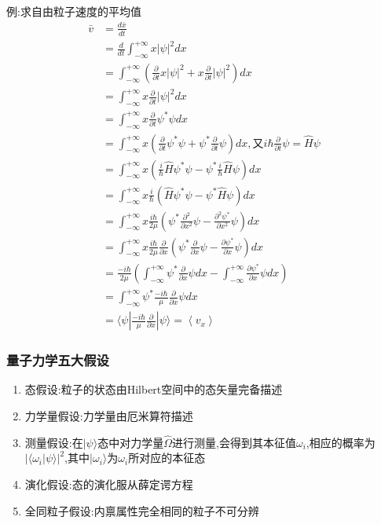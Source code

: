 \documentclass[lang=cn,10pt]{elegantbook}
\begin{document}
 例:求自由粒子速度的平均值
 \begin{equation*}
 	\begin{split}
 		\bar{v}&=\frac{d\bar{x}}{dt}
 		\\
 		&=\frac{d}{dt}\int_{-\infty}^{+\infty}{x|\psi |^2}dx
 		\\
 		&=\int_{-\infty}^{+\infty}{\left( \frac{\partial}{\partial t}x|\psi |^2+x\frac{\partial}{\partial t}|\psi |^2 \right)}dx
 		\\
 		&=\int_{-\infty}^{+\infty}{x\frac{\partial}{\partial t}|\psi |^2}dx
 		\\
 		&=\int_{-\infty}^{+\infty}{x\frac{\partial}{\partial t}\psi ^*\psi}dx
 		\\
 		&=\int_{-\infty}^{+\infty}{x\left( \frac{\partial}{\partial t}\psi ^*\psi +\psi ^*\frac{\partial}{\partial t}\psi \right)}dx,\text{又}i\hbar \frac{\partial}{\partial t}\psi =\hat{H}\psi 
 		\\
 		&=\int_{-\infty}^{+\infty}{x\left( \frac{i}{\hbar}\hat{H}\psi ^*\psi -\psi ^*\frac{i}{\hbar}\hat{H}\psi \right)}dx
 		\\
 		&=\int_{-\infty}^{+\infty}{x\frac{i}{\hbar}\left( \hat{H}\psi ^*\psi -\psi ^*\hat{H}\psi \right)}dx
 		\\
 		&=\int_{-\infty}^{+\infty}{x\frac{i\hbar}{2\mu}\left( \psi ^*\frac{\partial ^2}{\partial x^2}\psi -\frac{\partial ^2\psi ^*}{\partial x^2}\psi \right)}dx
 		\\
 		&=\int_{-\infty}^{+\infty}{x\frac{i\hbar}{2\mu}\frac{\partial}{\partial x}\left( \psi ^*\frac{\partial}{\partial x}\psi -\frac{\partial \psi ^*}{\partial x}\psi \right)}dx
 		\\
 		&=\frac{-i\hbar}{2\mu}\left( \int_{-\infty}^{+\infty}{\psi ^*\frac{\partial}{\partial x}\psi dx-\int_{-\infty}^{+\infty}{\frac{\partial \psi ^*}{\partial x}\psi dx}} \right) 
 		\\
 		&=\int_{-\infty}^{+\infty}{\psi ^*\frac{-i\hbar}{\mu}\frac{\partial}{\partial x}\psi}dx
 		\\
 		&=\langle \psi |\frac{-i\hbar}{\mu}\frac{\partial}{\partial x}|\psi \rangle =\left< v_x \right> 
 	\end{split}
 \end{equation*}
 
 \subsubsection{量子力学五大假设}
 \begin{enumerate}
 	\item 态假设:粒子的状态由Hilbert空间中的态矢量完备描述
 	\item 力学量假设:力学量由厄米算符描述
 	\item 测量假设:在$|\psi\rangle$态中对力学量$\hat{\Omega}$进行测量,会得到其本征值$\omega_i$,相应的概率为$ |\langle\omega_i|\psi\rangle|^2$,其中$|\omega_i\rangle$为$\omega_i$所对应的本征态
 	\item 演化假设:态的演化服从薛定谔方程
 	\item 全同粒子假设:内禀属性完全相同的粒子不可分辨
 	
 \end{enumerate}
\end{document}
